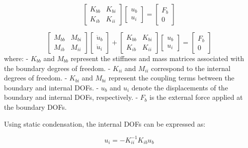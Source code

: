 \documentclass[a4paper, 10pt, conference]{ieeeconf}      %
\begin{document}
\begin{equation}
    \begin{bmatrix}
        K_{bb} & K_{bi} \\
        K_{ib} & K_{ii}
    \end{bmatrix}
    \begin{bmatrix}
        u_b \\
        u_i
    \end{bmatrix}
    =
    \begin{bmatrix}
        F_b \\
        0
    \end{bmatrix}
\end{equation}

\begin{equation}
    \begin{bmatrix}
        M_{bb} & M_{bi} \\
        M_{ib} & M_{ii}
    \end{bmatrix}
    \begin{bmatrix}
        \ddot{u}_b \\
        \ddot{u}_i
    \end{bmatrix}
    +
    \begin{bmatrix}
        K_{bb} & K_{bi} \\
        K_{ib} & K_{ii}
    \end{bmatrix}
    \begin{bmatrix}
        u_b \\
        u_i
    \end{bmatrix}
    =
    \begin{bmatrix}
        F_b \\
        0
    \end{bmatrix}
\end{equation}
where:
- \( K_{bb} \) and \( M_{bb} \) represent the stiffness and mass matrices associated with the boundary degrees of freedom.
- \( K_{ii} \) and \( M_{ii} \) correspond to the internal degrees of freedom.
- \( K_{bi} \) and \( M_{bi} \) represent the coupling terms between the boundary and internal DOFs.
- \( u_b \) and \( u_i \) denote the displacements of the boundary and internal DOFs, respectively.
- \( F_b \) is the external force applied at the boundary DOFs.

Using static condensation, the internal DOFs can be expressed as:

\begin{equation}
    u_i = -K_{ii}^{-1} K_{ib} u_b
\end{equation}
\end{document}
